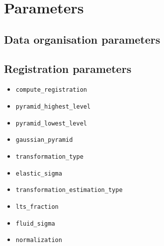 \section{Parameters}
\label{sec:cli:parameters}

\subsection{Data organisation parameters}

\subsection{Registration parameters}
\label{sec:cli:parameters:registration}

\begin{itemize}
\itemsep -0.5ex
\item \texttt{compute\_registration}
\item \texttt{pyramid\_highest\_level}
\item \texttt{pyramid\_lowest\_level}
\item \texttt{gaussian\_pyramid}
\item \texttt{transformation\_type}
\item \texttt{elastic\_sigma}
\item \texttt{transformation\_estimation\_type}
\item \texttt{lts\_fraction}
\item \texttt{fluid\_sigma}
\item \texttt{normalization}
\end{itemize}
